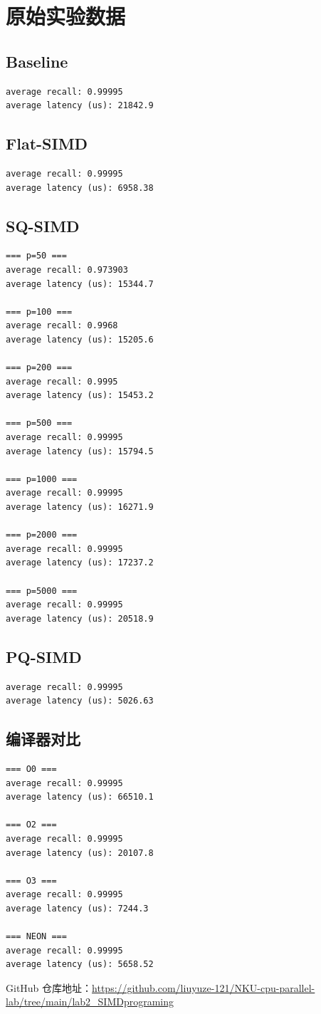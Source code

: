 \documentclass[a4paper]{article}
\begin{document}
\section{原始实验数据}

\subsection{Baseline}
\begin{lstlisting}[frame=single]
average recall: 0.99995
average latency (us): 21842.9
\end{lstlisting}

\subsection{Flat-SIMD}
\begin{lstlisting}[frame=single]
average recall: 0.99995
average latency (us): 6958.38
\end{lstlisting}

\subsection{SQ-SIMD}
\begin{lstlisting}[frame=single]
=== p=50 ===
average recall: 0.973903
average latency (us): 15344.7

=== p=100 ===
average recall: 0.9968
average latency (us): 15205.6

=== p=200 ===
average recall: 0.9995
average latency (us): 15453.2

=== p=500 ===
average recall: 0.99995
average latency (us): 15794.5

=== p=1000 ===
average recall: 0.99995
average latency (us): 16271.9

=== p=2000 ===
average recall: 0.99995
average latency (us): 17237.2

=== p=5000 ===
average recall: 0.99995
average latency (us): 20518.9
\end{lstlisting}

\subsection{PQ-SIMD}
\begin{lstlisting}[frame=single]
average recall: 0.99995
average latency (us): 5026.63
\end{lstlisting}

\subsection{编译器对比}
\begin{lstlisting}[frame=single]
=== O0 ===
average recall: 0.99995
average latency (us): 66510.1

=== O2 ===
average recall: 0.99995
average latency (us): 20107.8

=== O3 ===
average recall: 0.99995
average latency (us): 7244.3

=== NEON ===
average recall: 0.99995
average latency (us): 5658.52
\end{lstlisting}

GitHub 仓库地址：\href{https://github.com/liuyuze-121/NKU-cpu-parallel-lab/tree/main/lab2_SIMDprograming}{https://github.com/liuyuze-121/NKU-cpu-parallel-lab/tree/main/lab2\_SIMDprograming}
\end{document}
